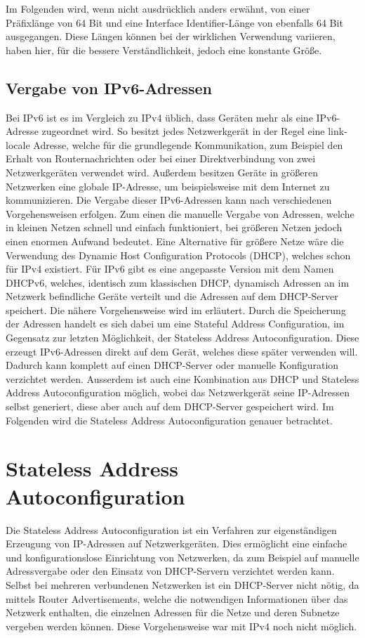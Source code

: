 \documentclass[a4paper, 12pt]{scrartcl}
\begin{document}
Im Folgenden wird, wenn nicht ausdrücklich anders erwähnt, von einer Präfixlänge von 64 Bit und eine Interface Identifier-Länge von ebenfalls 64 Bit ausgegangen.
Diese Längen können bei der wirklichen Verwendung variieren, haben hier, für die bessere Verständlichkeit, jedoch eine konstante Größe.

\subsection{Vergabe von IPv6-Adressen}
Bei IPv6 ist es im Vergleich zu IPv4 üblich, dass Geräten mehr als eine IPv6-Adresse zugeordnet wird. \cite{rfc4291} So besitzt jedes Netzwerkgerät in der Regel eine link-locale Adresse, welche für die grundlegende Kommunikation, zum Beispiel den Erhalt von Routernachrichten oder bei einer Direktverbindung von zwei Netzwerkgeräten verwendet wird. Außerdem besitzen Geräte in größeren Netzwerken eine globale IP-Adresse, um beispielsweise mit dem Internet zu kommunizieren.
Die Vergabe dieser IPv6-Adressen kann nach verschiedenen Vorgehensweisen erfolgen. Zum einen die manuelle Vergabe von Adressen, welche in kleinen Netzen schnell und einfach funktioniert, bei größeren Netzen jedoch einen enormen Aufwand bedeutet. 
Eine Alternative für größere Netze wäre die Verwendung des Dynamic Host Configuration Protocols (DHCP), welches schon für IPv4 existiert.
Für IPv6 gibt es eine angepasste Version mit dem Namen DHCPv6, welches, identisch zum klassischen DHCP, dynamisch Adressen an im Netzwerk befindliche Geräte verteilt und die Adressen auf dem DHCP-Server speichert. Die nähere Vorgehensweise wird im \cite{rfc3315} erläutert.
Durch die Speicherung der Adressen handelt es sich dabei um eine Stateful Address Configuration, im Gegensatz zur letzten Möglichkeit, der Stateless Address Autoconfiguration. 
Diese erzeugt IPv6-Adressen direkt auf dem Gerät, welches diese später verwenden will.
Dadurch kann komplett auf einen DHCP-Server oder manuelle Konfiguration verzichtet werden.
Ausserdem ist auch eine Kombination aus DHCP und Stateless Address Autoconfiguration möglich, wobei das Netzwerkgerät seine IP-Adressen selbst generiert, diese aber auch auf dem DHCP-Server gespeichert wird.
Im Folgenden wird die Stateless Address Autoconfiguration genauer betrachtet.

\newpage

\section{Stateless Address Autoconfiguration}
Die Stateless Address Autoconfiguration ist ein Verfahren zur eigenständigen Erzeugung von IP-Adressen auf Netzwerkgeräten.
Dies ermöglicht eine einfache und konfigurationslose Einrichtung von Netzwerken, da zum Beispiel auf manuelle Adressvergabe oder den Einsatz von DHCP-Servern verzichtet werden kann.
Selbst bei mehreren verbundenen Netzwerken ist ein DHCP-Server nicht nötig, da mittels Router Advertisements, welche die notwendigen Informationen über das Netzwerk enthalten, die einzelnen Adressen für die Netze und deren Subnetze vergeben werden können. Diese Vorgehensweise war mit IPv4 noch nicht möglich.
\end{document}
